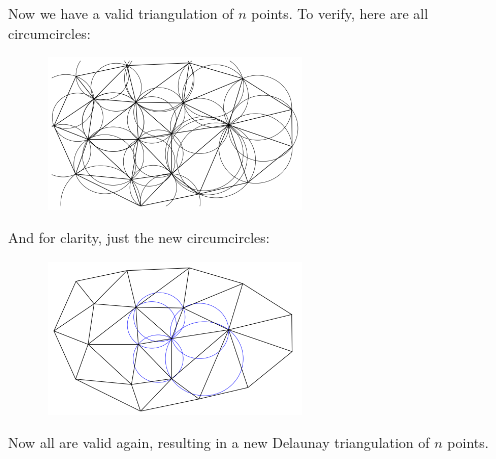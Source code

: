Now we have a valid triangulation of $n$ points. To verify, here are all circumcircles:
\begin{figure}[H]
    \centering
    \includegraphics[width=0.6\textwidth]{DelaunayVisualExample07.png}
\end{figure}
And for clarity, just the new circumcircles:
\begin{figure}[H]
    \centering
    \includegraphics[width=0.6\textwidth]{DelaunayVisualExample08.png}
\end{figure}
Now all are valid again, resulting in a new Delaunay triangulation
of $n$ points.

